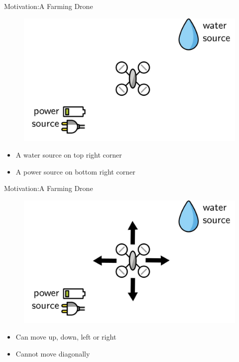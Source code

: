 \documentclass[usenames,dvipsnames]{beamer}
\begin{document}
\begin{frame}{Motivation:A Farming Drone}
    \begin{figure}
        \centering
        \includegraphics[scale=0.15]{images/drone-water-power.jpg}
    \end{figure}
    \begin{itemize}
        \item A water source on top right corner
        \item A power source on bottom right corner
    \end{itemize}
\end{frame}


\begin{frame}{Motivation:A Farming Drone}
    \begin{figure}
        \centering
        \includegraphics[scale=0.15]{images/drone-move.jpg}
    \end{figure}
    \begin{itemize}
        \item Can move up, down, left or right
        \item Cannot move diagonally
    \end{itemize}
\end{frame}
\end{document}
